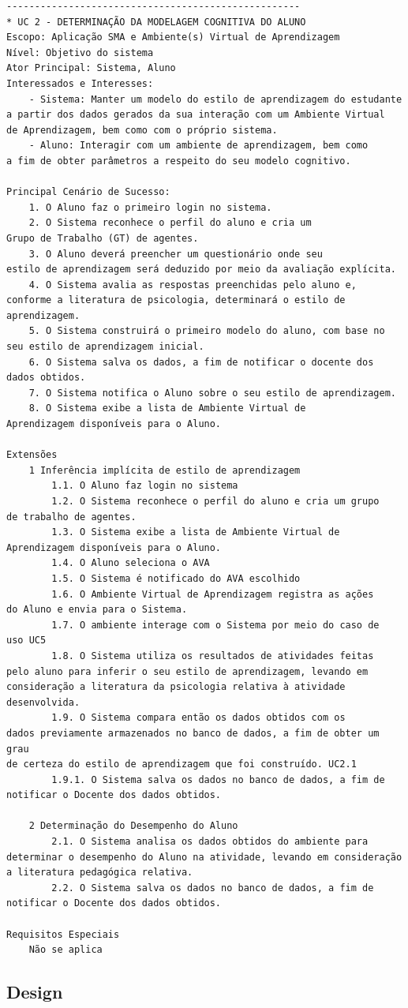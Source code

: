 \begin{lstlisting}[label=code:uc-modelagem-cognitiva,caption=Caso de Uso - Notificar Docente.]
----------------------------------------------------
* UC 2 - DETERMINAÇÃO DA MODELAGEM COGNITIVA DO ALUNO
Escopo: Aplicação SMA e Ambiente(s) Virtual de Aprendizagem
Nível: Objetivo do sistema
Ator Principal: Sistema, Aluno
Interessados e Interesses:
	- Sistema: Manter um modelo do estilo de aprendizagem do estudante
a partir dos dados gerados da sua interação com um Ambiente Virtual
de Aprendizagem, bem como com o próprio sistema.
	- Aluno: Interagir com um ambiente de aprendizagem, bem como
a fim de obter parâmetros a respeito do seu modelo cognitivo.

Principal Cenário de Sucesso:
	1. O Aluno faz o primeiro login no sistema.
	2. O Sistema reconhece o perfil do aluno e cria um
Grupo de Trabalho (GT) de agentes.
	3. O Aluno deverá preencher um questionário onde seu
estilo de aprendizagem será deduzido por meio da avaliação explícita.
	4. O Sistema avalia as respostas preenchidas pelo aluno e,
conforme a literatura de psicologia, determinará o estilo de aprendizagem.
	5. O Sistema construirá o primeiro modelo do aluno, com base no
seu estilo de aprendizagem inicial.
	6. O Sistema salva os dados, a fim de notificar o docente dos
dados obtidos.
	7. O Sistema notifica o Aluno sobre o seu estilo de aprendizagem.
	8. O Sistema exibe a lista de Ambiente Virtual de
Aprendizagem disponíveis para o Aluno.

Extensões
	1 Inferência implícita de estilo de aprendizagem
		1.1. O Aluno faz login no sistema
		1.2. O Sistema reconhece o perfil do aluno e cria um grupo
de trabalho de agentes.
		1.3. O Sistema exibe a lista de Ambiente Virtual de
Aprendizagem disponíveis para o Aluno.
		1.4. O Aluno seleciona o AVA
		1.5. O Sistema é notificado do AVA escolhido
		1.6. O Ambiente Virtual de Aprendizagem registra as ações
do Aluno e envia para o Sistema.
		1.7. O ambiente interage com o Sistema por meio do caso de
uso UC5
		1.8. O Sistema utiliza os resultados de atividades feitas
pelo aluno para inferir o seu estilo de aprendizagem, levando em
consideração a literatura da psicologia relativa à atividade desenvolvida.
		1.9. O Sistema compara então os dados obtidos com os
dados previamente armazenados no banco de dados, a fim de obter um grau
de certeza do estilo de aprendizagem que foi construído. UC2.1
		1.9.1. O Sistema salva os dados no banco de dados, a fim de
notificar o Docente dos dados obtidos.

	2 Determinação do Desempenho do Aluno
		2.1. O Sistema analisa os dados obtidos do ambiente para
determinar o desempenho do Aluno na atividade, levando em consideração
a literatura pedagógica relativa.
		2.2. O Sistema salva os dados no banco de dados, a fim de
notificar o Docente dos dados obtidos.

Requisitos Especiais
	Não se aplica

\end{lstlisting}










\subsection{Design}\label{subsection:design}
